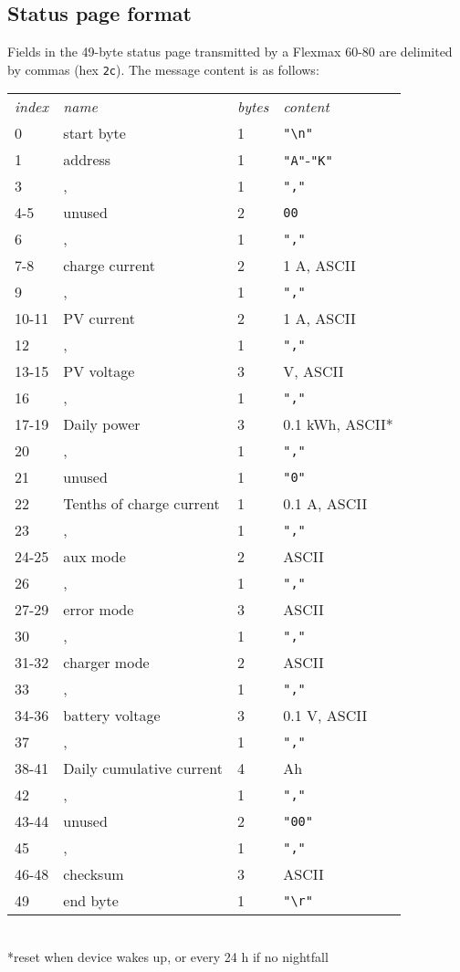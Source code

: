 \documentclass[pdftex,oneside,12pt,a4paper]{book}
\begin{document}
\subsection{Status page format}
Fields in the 49-byte status page transmitted by a Flexmax 60-80 are delimited by commas (hex \verb|2c|). The message content is as follows:\\
\begin{supertabular}{llll}
\emph{\small index} & \emph{\small name} & \emph{\small bytes} & \emph{\small content}\\
0 & start byte & 1 & \verb|"\n"|\\
1 & address & 1 & \verb|"A"|-\verb|"K"| \\
3 & , & 1 & \verb|","|\\
4-5 & unused & 2 & \verb|00|\\
6 & , & 1 & \verb|","|\\
7-8 & charge current & 2 & 1 A, ASCII\\
9 & , & 1 & \verb|","|\\
10-11 & PV current & 2 & 1 A, ASCII\\
12 & , & 1 & \verb|","|\\
13-15 & PV voltage & 3 & V, ASCII\\
16 & , & 1 & \verb|","|\\
17-19 & Daily power & 3 & 0.1 kWh, ASCII*\\
20 & , & 1 & \verb|","|\\
21 & unused & 1 & \verb|"0"| \\
22 & Tenths of charge current & 1 & 0.1 A, ASCII\\
23 & , & 1 & \verb|","|\\
24-25 & aux mode & 2 & ASCII \\
26 & , & 1 & \verb|","|\\
27-29 & error mode & 3 & ASCII \\
30 & , & 1 & \verb|","|\\
31-32 & charger mode & 2 & ASCII \\
33 & , & 1 & \verb|","|\\
34-36 & battery voltage & 3 & 0.1 V, ASCII\\
37 & , & 1 & \verb|","|\\
38-41 & Daily cumulative current & 4 & Ah \\
42 & , & 1 & \verb|","|\\
43-44 & unused & 2 & \verb|"00"|\\
45 & , & 1 & \verb|","|\\
46-48 & checksum & 3 & ASCII\\
49 & end byte & 1 & \verb|"\r"|\\
\end{supertabular}\\
{*}reset when device wakes up, or every 24 h if no nightfall\\
\end{document}
